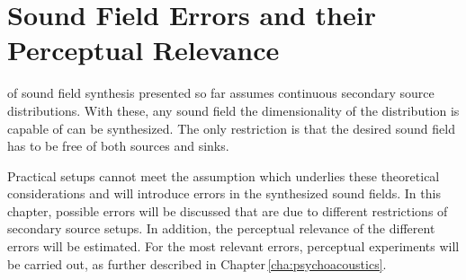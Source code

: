 \def \GITHUB {\GITHUBBASE/03_sound_field_errors_and_their_perceptual_relevance}
\graphicspath{%
{\PATH/\CHAPTHREE/fig3_01/}%
{\PATH/\CHAPTHREE/fig3_02/}%
{\PATH/\CHAPTHREE/fig3_03/}%
{\PATH/\CHAPTHREE/fig3_04/}%
{\PATH/\CHAPTHREE/fig3_05/}%
{\PATH/\CHAPTHREE/fig3_06/}%
{\PATH/\CHAPTHREE/fig3_07/}%
{\PATH/\CHAPTHREE/fig3_08/}%
{\PATH/\CHAPTHREE/fig3_09/}%
{\PATH/\CHAPTHREE/fig3_10/}%
{\PATH/\CHAPTHREE/fig3_11/}%
{\PATH/\CHAPTHREE/fig3_12/}%
{\PATH/\CHAPTHREE/fig3_13/}%
{\PATH/\CHAPTHREE/fig3_14/}%
{\PATH/\CHAPTHREE/fig3_15/}%
{\PATH/\CHAPTHREE/fig3_16/}%
{\PATH/\CHAPTHREE/fig3_17/}%
}


\chapter{Sound Field Errors and their Perceptual Relevance}
\label{cha:sound_field_errors_and_their_perceptual_relevance}
%
 of sound field synthesis presented so far assumes
continuous secondary source
distributions. With these, any sound field the dimensionality of the
distribution is capable of can be synthesized. The only restriction is that the desired sound
field has to be free of both sources and sinks.

Practical setups cannot meet the assumption which underlies these theoretical
considerations and will introduce errors in the synthesized sound fields.
In this chapter, possible errors will be discussed that are due to
different restrictions of secondary
source setups. In addition, the perceptual relevance of the
different errors will be estimated. For the most relevant errors, perceptual
experiments will be carried out, as further described in Chapter\,\ref{cha:psychoacoustics}.


